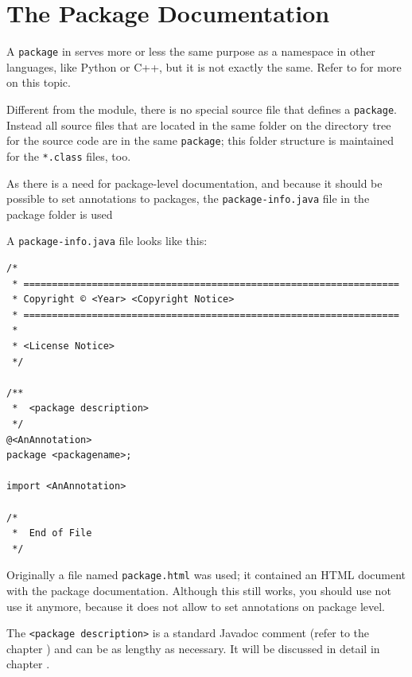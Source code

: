 \section{The Package Documentation}\label{sec:PackageDocumentation}
A \lstinline|package| in \Java serves more or less the same purpose as a namespace in other languages, like Python or \mbox{C++}, but it is not exactly the same. Refer to \autocite{ORACLE_DOC_LANGUAGE_SPECIFICATION:PackageDeclarations} for more on this topic.

Different from the module, there is no special source file that defines a \lstinline|package|. Instead all source files that are located in the same folder on the directory tree for the source code are in the same \lstinline|package|; this folder structure is maintained for the \texttt{*.class} files, too.

As there is a need for package-level documentation, and because it should be possible to set annotations to packages, the \texttt{package-info.java} file in the package folder is used

A \texttt{package-info.java} file looks like this:
\begin{lstlisting}[caption={package-info.java}]
/*
 * ==================================================================
 * Copyright © <Year> <Copyright Notice>
 * ==================================================================
 *
 * <License Notice>
 */
 
/**
 *  <package description>
 */
@<AnAnnotation> 
package <packagename>;

import <AnAnnotation>

/*
 *  End of File
 */
\end{lstlisting}

Originally a file named \texttt{package.html} was used; it contained an HTML document with the package documentation. Although this still works, you should use not use it anymore, because it does not allow to set annotations on package level. 

The \texttt{<package description>} is a standard Javadoc comment (refer to the chapter ) and can be as lengthy as necessary. It will be discussed in detail in chapter .

